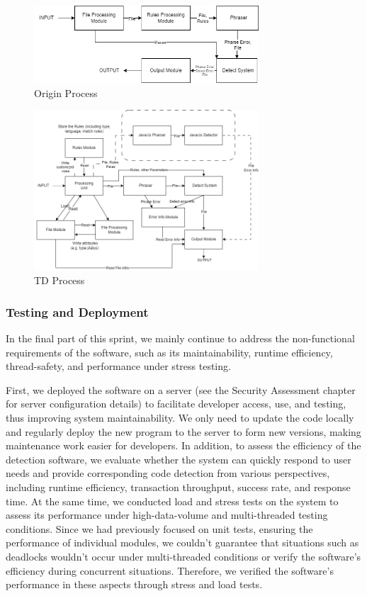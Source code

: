 \begin{figure}[h]
  \centering
  \includegraphics[width=3.3in]{figures/originprocess.png}
  \caption{Origin Process}
  \label{fig:originprocess}
  \end{figure}

  \begin{figure}[h]
    \centering
    \includegraphics[width=3.3in]{figures/tdprocess.png}
    \caption{TD Process}
    \label{fig:tdprocess}
    \end{figure}

\subsubsection{Testing and Deployment}
In the final part of this sprint, we mainly continue to address the non-functional requirements of the software, such as its maintainability, runtime efficiency, thread-safety, and performance under stress testing.

First, we deployed the software on a server (see the Security Assessment chapter for server configuration details) to facilitate developer access, use, and testing, thus improving system maintainability. We only need to update the code locally and regularly deploy the new program to the server to form new versions, making maintenance work easier for developers. In addition, to assess the efficiency of the detection software, we evaluate whether the system can quickly respond to user needs and provide corresponding code detection from various perspectives, including runtime efficiency, transaction throughput, success rate, and response time. At the same time, we conducted load and stress tests on the system to assess its performance under high-data-volume and multi-threaded testing conditions. Since we had previously focused on unit tests, ensuring the performance of individual modules, we couldn't guarantee that situations such as deadlocks wouldn't occur under multi-threaded conditions or verify the software's efficiency during concurrent situations. Therefore, we verified the software's performance in these aspects through stress and load tests.